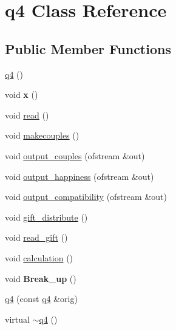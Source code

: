 \hypertarget{classq4}{\section{q4 Class Reference}
\label{classq4}
}
\subsection*{Public Member Functions}
\begin{DoxyCompactItemize}
\item 
\hyperlink{classq4_a2513bdf487bffc36546781c803c8aebd}{q4} ()
\item 
\hypertarget{classq4_a1f2d88240c8df5e08b2be19ef75f8293}{void {\bfseries x} ()}\label{classq4_a1f2d88240c8df5e08b2be19ef75f8293}

\item 
void \hyperlink{classq4_a7b78b4cd3c2b8adaef6b01dfceea9905}{read} ()
\item 
void \hyperlink{classq4_a21bd067b6f23a586d2c9a5db067ba430}{makecouples} ()
\item 
void \hyperlink{classq4_a4383aca5d108e44e2a37e7cc94582d91}{output\-\_\-couples} (ofstream \&out)
\item 
void \hyperlink{classq4_ae38c064fa782ea4807057df383bbecff}{output\-\_\-happiness} (ofstream \&out)
\item 
void \hyperlink{classq4_a05c1a785af4e5d3cb42ff477fdebfa32}{output\-\_\-compatibility} (ofstream \&out)
\item 
void \hyperlink{classq4_a519bef3d50f593cd412c80151bc7fba8}{gift\-\_\-distribute} ()
\item 
void \hyperlink{classq4_a1cbd66969ffb1f6a70decd99aa37d4a4}{read\-\_\-gift} ()
\item 
void \hyperlink{classq4_a6bbd29bf3a93f2660235411cf06e6726}{calculation} ()
\item 
\hypertarget{classq4_a33fb9e7a7bf357905fcbc23a2eee3731}{void {\bfseries Break\-\_\-up} ()}\label{classq4_a33fb9e7a7bf357905fcbc23a2eee3731}

\item 
\hyperlink{classq4_ac42d883649f87e6c50f2c5e706118c5f}{q4} (const \hyperlink{classq4}{q4} \&orig)
\item 
virtual \hyperlink{classq4_a8778df75b0f88cfe2cc43481b1f4e3e3}{$\sim$q4} ()
\end{DoxyCompactItemize}
